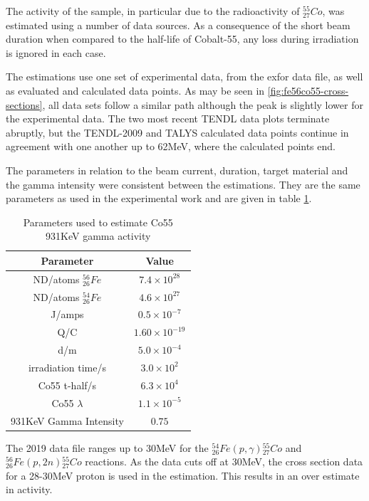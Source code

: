 The activity of the sample, in particular due to the radioactivity of ${}^{55}_{27}Co$, was estimated using a number of data sources.  As a consequence of the short beam duration when compared to the half-life of Cobalt-55, any loss during irradiation is ignored in each case.  

The estimations use one set of experimental data, from the \acrshort{exfor} data file, as well as evaluated and calculated data points.  As may be seen in \ref{fig:fe56co55-cross-sections}, all data sets follow a similar path although the peak is slightly lower for the experimental data.  The two most recent TENDL data plots terminate abruptly, but the TENDL-2009 and TALYS calculated data points continue in agreement with one another up to 62MeV, where the calculated points end.

The parameters in relation to the beam current, duration, target material and the gamma intensity were consistent between the estimations.  They are the same parameters as used in the experimental work and are given in table \ref{table:activityestimation1}.

\FloatBarrier
\begin{table}[h]
\begin{center}
\begin{tabular}{c c}
\hline\hline
Parameter & Value\\
\hline\hline
ND/atoms ${}^{56}_{26}Fe$ & $7.4 \times 10^{28}$ \\
ND/atoms ${}^{54}_{26}Fe$ & $4.6 \times 10^{27}$ \\
J/amps & $0.5 \times 10^{-7}$ \\
Q/C & $1.60 \times 10^{-19}$ \\
d/m & $5.0 \times 10^{-4}$ \\
irradiation time/s & $3.0 \times 10^{2}$ \\
Co55 t-half/s & $6.3 \times 10^{4}$ \\
Co55 $\lambda$ & $1.1 \times 10^{-5}$ \\
931KeV Gamma Intensity & $0.75$ \\
\hline\hline
\end{tabular}
\end{center}
\caption{Parameters used to estimate Co55 931KeV gamma activity}
\label{table:activityestimation1}
\end{table}

The 2019 data file ranges up to 30MeV for the ${}^{54}_{26} Fe (p, \gamma) {}^{55}_{27} Co$ and ${}^{56}_{26} Fe (p, 2n) {}^{55}_{27} Co$ reactions.  As the data cuts off at 30MeV, the cross section data for a 28-30MeV proton is used in the estimation.  This results in an over estimate in activity.

